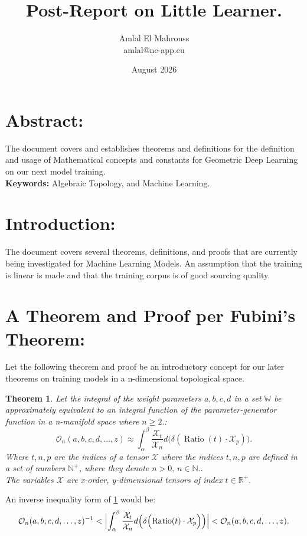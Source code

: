 \documentclass{article}
\title{Post-Report on Little Learner.}
\author{Amlal El Mahrouss\\amlal@ne-app.eu}
\date{August 2026}
\newtheorem{theorem}{Theorem}
\begin{document}
	
	\maketitle
	
	\section{Abstract:}
	
	The document covers and establishes theorems and definitions for the definition and usage of Mathematical concepts and constants for Geometric Deep Learning on our next model training.\\
	\textbf{Keywords:} Algebraic Topology, and Machine Learning.
	
	\section{Introduction:}
	The document covers several theorems, definitions, and proofs that are currently being investigated for Machine Learning Models. An assumption that the training is linear is made and that the training corpus is of good sourcing quality.
	
	\section{A Theorem and Proof per Fubini's Theorem:}
	Let the following theorem and proof be an introductory concept for our later theorems on training models in a n-dimensional topological space.
	
	\begin{theorem}
		\label{th:1}
		Let the integral of the weight parameters $a, b, c, d$ in a set $\mathbb{W}$ be approximately equivalent to an integral function of the parameter-generator function in a n-manifold space where $n \ge 2.$:
		\begin{equation}
			\mathcal{O}_{n}(a, b, c, d, \dots, z) \approx \int_{\alpha}^{\beta} \frac{\mathcal{X}_t}{\mathcal{X}_n} d\bigl(\delta(\operatorname{Ratio}(t) \cdot \mathcal{X}_p)\bigr).
		\end{equation}
		Where $t, n, p$ are the indices of a tensor $\mathcal{X}$ where the indices $t, n, p$ are defined in a set of numbers $\mathbb{N}^{+}$, where they denote $n > 0, \, n \in \mathbb{N}.$.\\The variables $\mathcal{X}$ are x-order, y-dimensional tensors of index $t \in \mathbb{R}^{+}.$
	\end{theorem}
	An inverse inequality form of \ref{th:1} would be:
	\begin{equation}
		\label{ineq:1}
		\mathcal{O}_{n}(a, b, c, d, \dots, z)^{-1} < \Bigl| \int_{\alpha}^{\beta} \frac{\mathcal{X}_t}{\mathcal{X}_n} d\Bigl(\delta\Bigl(\operatorname{Ratio}(t) \cdot \mathcal{X}_p\Bigr)\Bigr) \Bigr| < \mathcal{O}_{n}(a, b, c, d, \dots, z).
	\end{equation}
	
\end{document}
